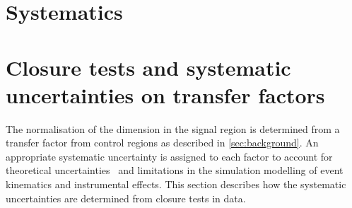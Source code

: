 \section{Systematics}
\label{sec:systematics}


%
%
%
%

\section{Closure tests and systematic uncertainties on transfer factors\label{sec:bkgd-syst}}

The normalisation of the \mht dimension in the signal region is determined from 
a transfer factor from control regions as described in \ref{sec:background}. 
An appropriate systematic uncertainty is assigned to each factor to
account for theoretical uncertainties~\cite{Bern:2011pa} and
limitations in the simulation modelling of event kinematics and
instrumental effects. This section describes how the systematic
uncertainties are determined from closure tests in data.

